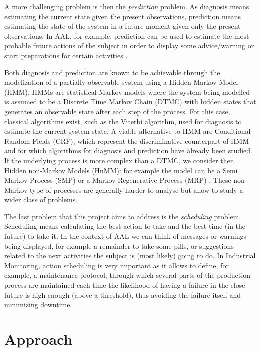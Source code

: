\documentclass{article}
\begin{document}
        A more challenging problem is then the \textit{prediction} problem. As diagnosis means estimating the current state given the present observations, prediction means estimating the state of the system in a future moment given only the present observations. In AAL, for example, prediction can be used to estimate the most probable future actions of the subject in order to display some advice/warning or start preparations for certain activities \cite{epew16}.
        
        Both diagnosis and prediction are known to be achievable through the modelization of a partially observable system using a Hidden Markov Model (HMM). HMMs are statistical Markov models where the system being modelled is assumed to be a Discrete Time Markov Chain (DTMC) with hidden states that generates an observable state after each step of the process. For this case, classical algorithms exist, such as the Viterbi algorithm, used for diagnosis to estimate the current system state. A viable alternative to HMM are Conditional Random Fields (CRF), which represent the discriminative counterpart of HMM and for which algorithms for diagnosis and prediction have already been studied. If the underlying process is more complex than a DTMC, we consider then Hidden non-Markov Models (HnMM): for example the model can be a Semi Markov Process (SMP) or a Markov Regenerative Process (MRP) \cite{logothetis1995markov}. These non-Markov type of processes are generally harder to analyse but allow to study a wider class of problems.
        
        The last problem that this project aims to address is the \textit{scheduling} problem. Scheduling means calculating the best action to take and the best time (in the future) to take it. In the context of AAL we can think of messages or warnings being displayed, for example a remainder to take some pills, or suggestions related to the next activities the subject is (most likely) going to do. In Industrial Monitoring, action scheduling is very important as it allows to define, for example, a maintenance protocol, through which several parts of the production process are maintained each time the likelihood of having a failure in the close future is high enough (above a threshold), thus avoiding the failure itself and minimizing downtime.
    
    \section*{Approach}
        
        
    
    \clearpage
    
	\nocite{*}
	
	
\end{document}
